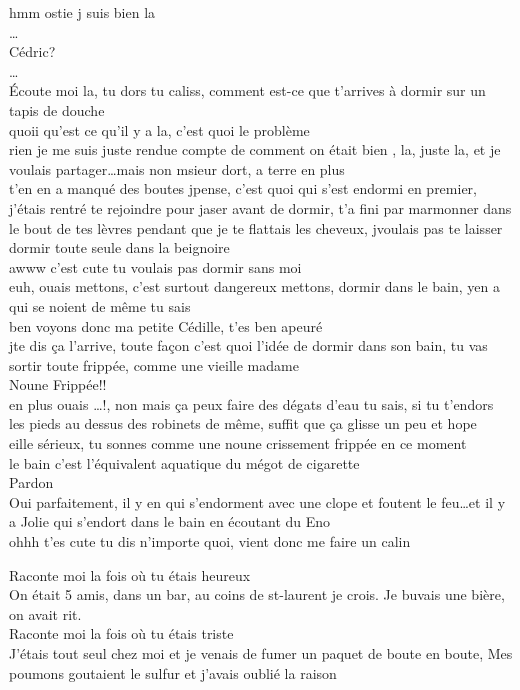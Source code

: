 \begin{drama}
hmm ostie j suis bien la \\[2ex]
\ldots \\[2ex]
Cédric? \\[2ex]
\ldots \\[2ex]
Écoute moi la, tu dors tu caliss, comment est-ce que t'arrives à
dormir sur un tapis de douche\\[2ex]
quoii qu'est ce qu'il y a la, c'est quoi le problème\\[2ex]
rien je me suis juste rendue compte de comment on était bien ,
la, juste la, et je voulais partager\ldots mais non msieur
dort, a terre en plus \\[2ex]
t'en en a manqué des boutes jpense, c'est quoi qui 
s'est endormi en premier, j'étais rentré te rejoindre pour jaser avant
de dormir, t'a fini par marmonner dans le bout de tes lèvres
pendant que je te flattais les cheveux, jvoulais pas te laisser
dormir toute seule dans la beignoire\\[2ex]
awww c'est cute tu voulais pas dormir sans moi\\[2ex]
euh, ouais mettons, c'est surtout dangereux mettons, dormir
dans le bain, yen a qui se noient de même tu sais\\[2ex]
ben voyons donc ma petite Cédille, t'es ben apeuré\\[2ex]
jte dis ça l'arrive, toute façon c'est quoi l'idée de dormir
dans son bain, tu vas sortir toute frippée, comme une vieille 
madame\\[2ex]
Noune Frippée!!\\[2ex]
en plus ouais \ldots !, non mais ça peux faire des dégats d'eau tu sais,
si tu t'endors les pieds au dessus des robinets de même, suffit
que ça glisse un peu et hope\\[2ex]
eille sérieux, tu sonnes comme une noune crissement frippée en ce moment\\[2ex]
le bain c'est l'équivalent aquatique du mégot de cigarette\\[2ex]
Pardon\\[2ex]
Oui parfaitement, il y en qui s'endorment avec une clope et foutent
le feu\ldots et il y a Jolie qui s'endort dans le bain en écoutant
du Eno\\[2ex]
ohhh t'es cute tu dis n'importe quoi, vient donc me faire un calin 
\clearpage

Raconte moi la fois où tu étais heureux\\[2ex]
On était 5 amis, dans un bar, au coins de st-laurent je crois. 
Je buvais une bière, on avait rit.\\[2ex]
Raconte moi la fois où tu étais triste\\[2ex]
J'étais tout seul chez moi et je venais de fumer
un paquet de boute en boute, Mes poumons goutaient le sulfur
et j'avais oublié la raison




\end{drama}

